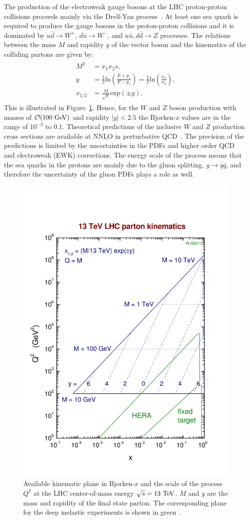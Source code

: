 The production of the electroweak gauge bosons at the LHC proton-proton collisions proceeds mainly via the Drell-Yan process~\cite{Drell:1970wh}. At least one sea quark is required to produce the gauge bosons in the proton-proton collisions and it is dominated by $u\bar{d} \rightarrow W^{+}$, $d\bar{u} \rightarrow W^{-}$, and $u\bar{u},d\bar{d} \rightarrow Z$ processes. The relations between the mass $M$ and rapidity $y$ of the vector boson and the kinematics of the colliding partons are given by:
\begin{eqnarray} \label{eq:kinematics}
\begin{aligned}
M^2 &= x_{1}x_{2}s, \\
y &= \frac{1}{2} \mathrm{ln}\left(\frac{E+p_{z}}{E-p_{z}}\right) = \frac{1}{2}\mathrm{ln}\left(\frac{x_1}{x_2}\right), \\
x_{1/2} &= \frac{M}{\sqrt{s}} \mathrm{exp}(\pm y).
\end{aligned}
\end{eqnarray}   
This is illustrated in Figure~\ref{fig:lhc_grid}. Hence, for the $W$ and $Z$ boson production with masses of $\mathcal{O} (100~\mathrm{Ge\kern -0.1em V})$ and rapidity $|y|<2.5$ the Bjorken-$x$ values are in the range of $10^{-3}$ to $0.1$. Theoretical predictions of the inclusive $W$ and $Z$ production cross sections are available at NNLO in perturbative QCD~\cite{Rijken:1994sh,Hamberg:1990np,vanNeerven:1991gh,Harlander:2002wh,PhysRevD.69.094008}. The precision of the predictions is limited by the uncertainties in the PDFs and higher order QCD and electroweak (EWK) corrections. The energy scale of the process means that the sea quarks in the protons are mainly due to the gluon splitting, $g \rightarrow q\bar{q}$, and therefore the uncertainty of the gluon PDFs plays a role as well.

\begin{figure}[h]
\centering
\includegraphics[width=0.49\columnwidth]{figures_chapter2/lhcgrid13}
\caption{Available kinematic plane in Bjorken-$x$ and the scale of the process $Q^2$ at the LHC center-of-mass energy $\sqrt{s}=13~\mathrm{Te\kern -0.1em V}$. $M$ and $y$ are the mass and rapidity of the final state parton. The corresponding plane for the deep inelastic experiments is shown in green~\cite{sterling}. }
\label{fig:lhc_grid}
\end{figure} 

